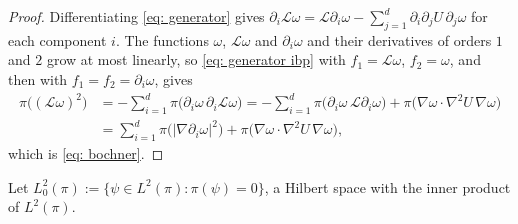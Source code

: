 \begin{proof}
    Differentiating \eqref{eq: generator} gives $\partial_i \mathcal L \omega = \mathcal L \partial_i \omega - \sum_{j=1}^d \partial_i \partial_j U\, \partial_j \omega$ for each component $i$. The functions $\omega$, $\mathcal L \omega$ and $\partial_i \omega$ and their derivatives of orders $1$ and $2$ grow at most linearly, so \eqref{eq: generator ibp} with $f_1 = \mathcal L \omega$, $f_2 = \omega$, and then with $f_1 = f_2 = \partial_i \omega$, gives
    \begin{equation*}
    \begin{aligned}
        \pi\bigl( (\mathcal L \omega)^2 \bigr) & = -\sum_{i=1}^d \pi\bigl( \partial_i \omega\, \partial_i \mathcal L \omega \bigr) = -\sum_{i=1}^d \pi\bigl( \partial_i \omega\, \mathcal L \partial_i \omega \bigr) + \pi\bigl( \nabla \omega \cdot \nabla^2 U\, \nabla \omega \bigr) \\
        & = \sum_{i=1}^d \pi\bigl( |\nabla \partial_i \omega|^2 \bigr) + \pi\bigl( \nabla \omega \cdot \nabla^2 U\, \nabla \omega \bigr) ,
    \end{aligned}
    \end{equation*}
    which is \eqref{eq: bochner}.
\end{proof}

Let $L^2_0(\pi) := \bigl\{ \psi \in L^2(\pi) : \pi(\psi) = 0 \bigr\}$, a Hilbert space with the inner product of $L^2(\pi)$.

